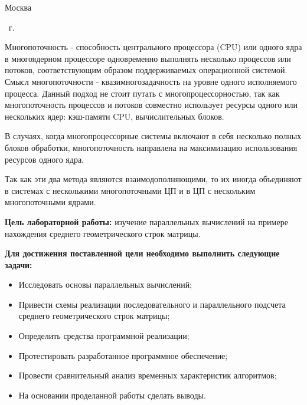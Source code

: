 \begin{center}
	\mbox{}
	\vfill
	Москва
\end{center}

\begin{center}
	\the\year ~г.
\end{center}
\clearpage

\renewcommand\contentsname{\hfill{\normalfont{СОДЕРЖАНИЕ}}\hfill}  %
\tableofcontents
\newpage


Многопоточность - способность центрального процессора (CPU) или одного ядра в многоядерном процессоре одновременно выполнять несколько процессов или потоков, соответствующим образом поддерживаемых операционной системой. Смысл многопоточности - квазимногозадачность на уровне одного исполняемого процесса. Данный подход не стоит путать с многопроцессорностью, так как многопоточность процессов и потоков совместно использует ресурсы одного или нескольких ядер: кэш-памяти CPU, вычислительных блоков.

В случаях, когда многопроцессорные системы включают в себя несколько полных блоков обработки, многопоточность направлена на максимизацию использования ресурсов одного ядра.

Так как эти два метода являются взаимодополняющими, то их иногда объединяют в системах с несколькими многопоточными ЦП и в ЦП с нескольким многопоточными ядрами. 

\textbf{Цель лабораторной работы:} изучение параллельных вычислений на примере нахождения среднего геометрического строк матрицы.

\textbf{Для достижения поставленной цели необходимо выполнить следующие задачи:}

\begin{itemize}
    \item Исследовать основы параллельных вычислений;
    \item Привести схемы реализации последовательного и параллельного подсчета среднего геометрического строк матрицы;
    \item Определить средства программной реализации;
    \item Протестировать разработанное программное обеспечение;
    \item Провести сравнительный анализ временных характеристик алгоритмов;
    \item На основании проделанной работы сделать выводы.
\end{itemize}

